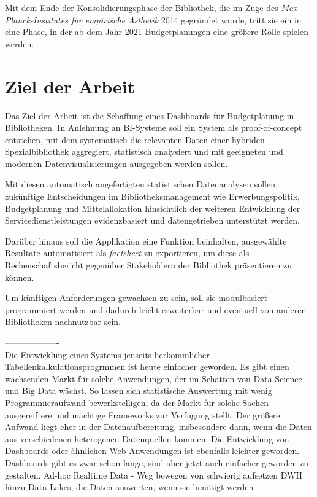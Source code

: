 
Mit dem Ende der Konsolidierungsphase der
Bibliothek, die im Zuge des \textit{Max-Planck-Institutes für empirische
Ästhetik} 2014 gegründet wurde, tritt sie ein in eine Phase, in der ab dem Jahr
2021 Budgetplanungen eine größere Rolle spielen werden.


\section{Ziel der Arbeit}
Das Ziel der Arbeit ist die Schaffung eines Dashboards für Budgetplanung in Bibliotheken. 
In Anlehnung an \acrfull{BI}-Systeme soll ein System als proof-of-concept entstehen,
mit dem systematisch die relevanten Daten einer hybriden Spezialbibliothek aggregiert, statistisch
analysiert und mit geeigneten und modernen Datenvisualisierungen ausgegeben werden sollen.

Mit diesen automatisch angefertigten statistischen Datenanalysen sollen zukünftige
Entscheidungen im Bibliotheksmanagement wie Erwerbungspolitik, Budgetplanung und
Mittelallokation hinsichtlich der weiteren Entwicklung der
Servicedienstleistungen evidenzbasiert und datengetrieben unterstützt werden.

Darüber hinaus soll die Applikation  eine Funktion beinhalten, ausgewählte
Resultate automatisiert als \textit{factsheet} zu exportieren, um diese
als Rechenschaftsbericht gegenüber Stakeholdern der Bibliothek präsentieren zu können.

Um künftigen Anforderungen gewachsen zu sein, soll sie
modulbasiert programmiert werden und dadurch leicht erweiterbar und eventuell von
anderen Bibliotheken nachnutzbar sein.


-------------------\\
Die Entwicklung eines Systems jenseits herkömmlicher Tabellenkalkulationsprogrmmen ist heute einfacher geworden. Es gibt einen wachsenden Markt für
solche Anwendungen, der im Schatten von Data-Science und Big Data wächst. So lassen sich statistische Auswertung mit wenig Programmieraufwand bewerkstelligen, da
der Markt für solche Sachen ausgereiftere und mächtige Frameworks zur Verfügung stellt. Der größere Aufwand liegt eher in der Datenaufbereitung, insbesondere dann, wenn die
Daten aus verschiedenen heterogenen Datenquellen kommen. Die Entwicklung von Dashboards oder ähnlichen Web-Anwendungen ist ebenfalls leichter geworden.
Dashboards gibt es zwar schon lange, sind aber jetzt auch einfacher geworden zu gestalten.
Ad-hoc Realtime Data - Weg bewegen von schwierig aufsetzen DWH hinzu Data Lakes, die Daten auswerten, wenn sie benötigt werden

